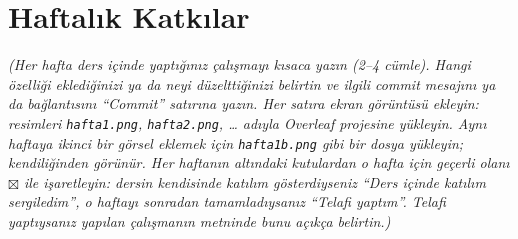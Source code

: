 \documentclass[12pt,a4paper]{article}
\newcommand{\aciklama}[1]{{\color{gray}\itshape (#1)}}
\begin{document}
\section{Haftalık Katkılar}
\aciklama{Her hafta ders içinde yaptığınız çalışmayı kısaca yazın (2--4 cümle). Hangi
özelliği eklediğinizi ya da neyi düzelttiğinizi belirtin ve ilgili commit mesajını
ya da bağlantısını ``Commit'' satırına yazın. Her satıra ekran görüntüsü ekleyin:
resimleri \texttt{hafta1.png}, \texttt{hafta2.png}, \ldots{} adıyla Overleaf
projesine yükleyin. Aynı haftaya ikinci bir görsel eklemek için
\texttt{hafta1b.png} gibi bir dosya yükleyin; kendiliğinden görünür.
Her haftanın altındaki kutulardan o hafta için geçerli olanı $\boxtimes$ ile
işaretleyin: dersin kendisinde katılım gösterdiyseniz ``Ders içinde katılım
sergiledim'', o haftayı sonradan tamamladıysanız ``Telafi yaptım''. Telafi
yaptıysanız yapılan çalışmanın metninde bunu açıkça belirtin.}
\end{document}
